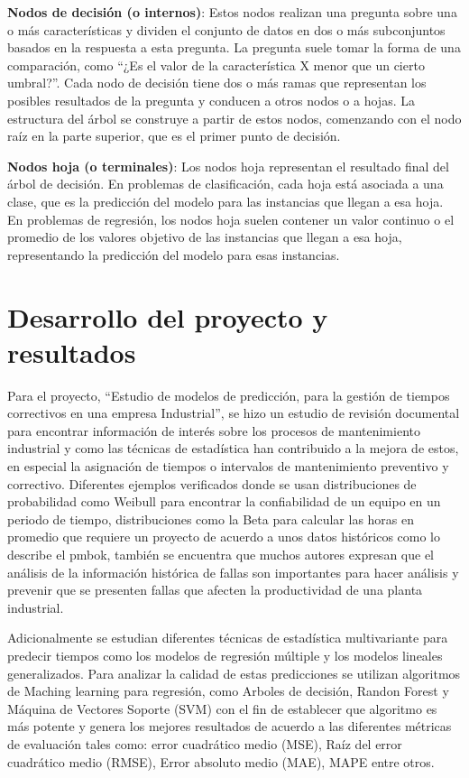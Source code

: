 \documentclass[
  11pt,
  bookmarksnumbered]{article}
\begin{document}
\textbf{Nodos de decisión (o internos)}: Estos nodos realizan una pregunta sobre una o más características y dividen el conjunto de datos en dos o más subconjuntos basados en la respuesta a esta pregunta.
La pregunta suele tomar la forma de una comparación, como ``¿Es el valor de la característica X menor que un cierto umbral?''.
Cada nodo de decisión tiene dos o más ramas que representan los posibles resultados de la pregunta y conducen a otros nodos o a hojas.
La estructura del árbol se construye a partir de estos nodos, comenzando con el nodo raíz en la parte superior, que es el primer punto de decisión.

\textbf{Nodos hoja (o terminales)}: Los nodos hoja representan el resultado final del árbol de decisión.
En problemas de clasificación, cada hoja está asociada a una clase, que es la predicción del modelo para las instancias que llegan a esa hoja.
En problemas de regresión, los nodos hoja suelen contener un valor continuo o el promedio de los valores objetivo de las instancias que llegan a esa hoja, representando la predicción del modelo para esas instancias.

\newpage

\hypertarget{desarrollo-del-proyecto-y-resultados}{%
\section{Desarrollo del proyecto y resultados}\label{desarrollo-del-proyecto-y-resultados}}

Para el proyecto, ``Estudio de modelos de predicción, para la gestión de tiempos correctivos en una empresa Industrial'', se hizo un estudio de revisión documental para encontrar información de interés sobre los procesos de mantenimiento industrial y como las técnicas de estadística han contribuido a la mejora de estos, en especial la asignación de tiempos o intervalos de mantenimiento preventivo y correctivo.
Diferentes ejemplos verificados donde se usan distribuciones de probabilidad como Weibull para encontrar la confiabilidad de un equipo en un periodo de tiempo, distribuciones como la Beta para calcular las horas en promedio que requiere un proyecto de acuerdo a unos datos históricos como lo describe el pmbok, también se encuentra que muchos autores expresan que el análisis de la información histórica de fallas son importantes para hacer análisis y prevenir que se presenten fallas que afecten la productividad de una planta industrial.

Adicionalmente se estudian diferentes técnicas de estadística multivariante para predecir tiempos como los modelos de regresión múltiple y los modelos lineales generalizados.
Para analizar la calidad de estas predicciones se utilizan algoritmos de Maching learning para regresión, como Arboles de decisión, Randon Forest y Máquina de Vectores Soporte (SVM) con el fin de establecer que algoritmo es más potente y genera los mejores resultados de acuerdo a las diferentes métricas de evaluación tales como: error cuadrático medio (MSE), Raíz del error cuadrático medio (RMSE), Error absoluto medio (MAE), MAPE entre otros.
\end{document}
